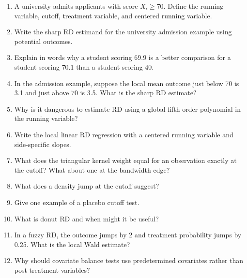 \begin{enumerate}
    \item A university admits applicants with score $X_i\geq 70$. Define the running variable, cutoff, treatment variable, and centered running variable.
    \item Write the sharp RD estimand for the university admission example using potential outcomes.
    \item Explain in words why a student scoring 69.9 is a better comparison for a student scoring 70.1 than a student scoring 40.
    \item In the admission example, suppose the local mean outcome just below 70 is 3.1 and just above 70 is 3.5. What is the sharp RD estimate?
    \item Why is it dangerous to estimate RD using a global fifth-order polynomial in the running variable?
    \item Write the local linear RD regression with a centered running variable and side-specific slopes.
    \item What does the triangular kernel weight equal for an observation exactly at the cutoff? What about one at the bandwidth edge?
    \item What does a density jump at the cutoff suggest?
    \item Give one example of a placebo cutoff test.
    \item What is donut RD and when might it be useful?
    \item In a fuzzy RD, the outcome jumps by 2 and treatment probability jumps by 0.25. What is the local Wald estimate?
    \item Why should covariate balance tests use predetermined covariates rather than post-treatment variables?
\end{enumerate}


